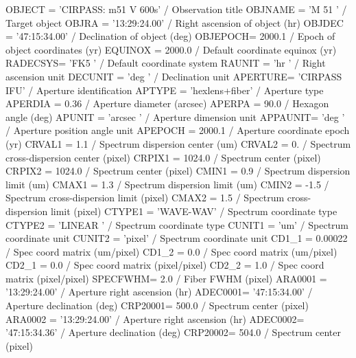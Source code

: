 \documentclass[twoside,11pt]{starlink}
\begin{document}
\begin{small}
\begin{terminalv}
OBJECT  = 'CIRPASS: m51 V 600s' / Observation title
OBJNAME = 'M 51    '           / Target object
OBJRA   = '13:29:24.00'        / Right ascension of object (hr)
OBJDEC  = '47:15:34.00'        / Declination of object (deg)
OBJEPOCH=               2000.1 / Epoch of object coordinates (yr)
EQUINOX =               2000.0 / Default coordinate equinox (yr)
RADECSYS= 'FK5     '           / Default coordinate system
RAUNIT  = 'hr      '           / Right ascension unit
DECUNIT = 'deg     '           / Declination unit
APERTURE= 'CIRPASS IFU'        / Aperture identification
APTYPE  = 'hexlens+fiber'      / Aperture type
APERDIA =                 0.36 / Aperture diameter (arcsec)
APERPA  =                 90.0 / Hexagon angle (deg)
APUNIT  = 'arcsec  '           / Aperture dimension unit
APPAUNIT= 'deg     '           / Aperture position angle unit
APEPOCH =               2000.1 / Aperture coordinate epoch (yr)
CRVAL1  =                  1.1 / Spectrum dispersion center (um)
CRVAL2  =                   0. / Spectrum cross-dispersion center (pixel)
CRPIX1  =               1024.0 / Spectrum center (pixel)
CRPIX2  =               1024.0 / Spectrum center (pixel)
CMIN1   =                  0.9 / Spectrum dispersion limit (um)
CMAX1   =                  1.3 / Spectrum dispersion limit (um)
CMIN2   =                 -1.5 / Spectrum cross-dispersion limit (pixel)
CMAX2   =                  1.5 / Spectrum cross-dispersion limit (pixel)
CTYPE1  = 'WAVE-WAV'           / Spectrum coordinate type
CTYPE2  = 'LINEAR  '           / Spectrum coordinate type
CUNIT1  = 'um'                 / Spectrum coordinate unit
CUNIT2  = 'pixel'              / Spectrum coordinate unit
CD1_1   =              0.00022 / Spec coord matrix (um/pixel)
CD1_2   =                  0.0 / Spec coord matrix (um/pixel)
CD2_1   =                  0.0 / Spec coord matrix (pixel/pixel)
CD2_2   =                  1.0 / Spec coord matrix (pixel/pixel)
SPECFWHM=                  2.0 / Fiber FWHM (pixel)
ARA0001 = '13:29:24.00'        / Aperture right ascension (hr)
ADEC0001= '47:15:34.00'        / Aperture declination (deg)
CRP20001=                500.0 / Spectrum center (pixel)
ARA0002 = '13:29:24.00'        / Aperture right ascension (hr)
ADEC0002= '47:15:34.36'        / Aperture declination (deg)
CRP20002=                504.0 / Spectrum center (pixel)
\end{terminalv}
\end{small}
\end{document}
